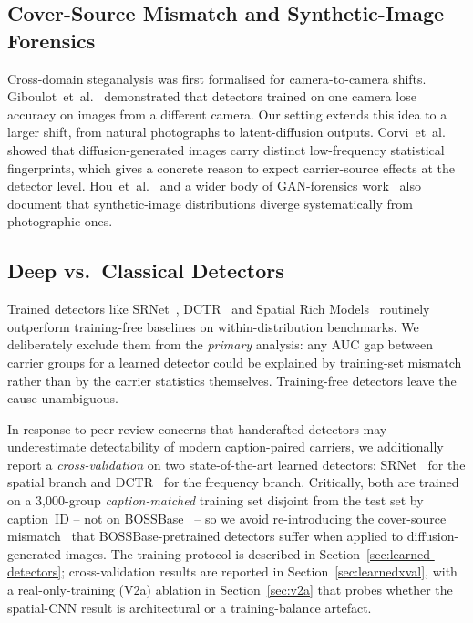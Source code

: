 \documentclass[10pt,twocolumn,a4paper]{article}
\begin{document}
\subsection{Cover-Source Mismatch and Synthetic-Image Forensics}
Cross-domain steganalysis was first formalised for camera-to-camera shifts. Giboulot~et~al.~\cite{giboulot2020csm} demonstrated that detectors trained on one camera lose accuracy on images from a different camera. Our setting extends this idea to a larger shift, from natural photographs to latent-diffusion outputs. Corvi~et~al.~\cite{corvi2023diffusion} showed that diffusion-generated images carry distinct low-frequency statistical fingerprints, which gives a concrete reason to expect carrier-source effects at the detector level. Hou~et~al.~\cite{hou2021gan} and a wider body of GAN-forensics work~\cite{rossler2019fake} also document that synthetic-image distributions diverge systematically from photographic ones.

\subsection{Deep vs.\ Classical Detectors}
Trained detectors like SRNet~\cite{boroumand2019srnet}, DCTR~\cite{holub2015dctr} and Spatial Rich Models~\cite{fridrich2012srm} routinely outperform training-free baselines on within-distribution benchmarks. We deliberately exclude them from the \emph{primary} analysis: any AUC gap between carrier groups for a learned detector could be explained by training-set mismatch rather than by the carrier statistics themselves. Training-free detectors leave the cause unambiguous.

In response to peer-review concerns that handcrafted detectors may underestimate detectability of modern caption-paired carriers, we additionally report a \emph{cross-validation} on two state-of-the-art learned detectors: SRNet~\cite{boroumand2019srnet} for the spatial branch and DCTR~\cite{holub2015dctr} for the frequency branch. Critically, both are trained on a 3{,}000-group \emph{caption-matched} training set disjoint from the test set by caption~ID -- not on BOSSBase~\cite{bas2011boss} -- so we avoid re-introducing the cover-source mismatch~\cite{giboulot2020csm,mallet2024csm} that BOSSBase-pretrained detectors suffer when applied to diffusion-generated images. The training protocol is described in Section~\ref{sec:learned-detectors}; cross-validation results are reported in Section~\ref{sec:learnedxval}, with a real-only-training (V2a) ablation in Section~\ref{sec:v2a} that probes whether the spatial-CNN result is architectural or a training-balance artefact.
\end{document}
